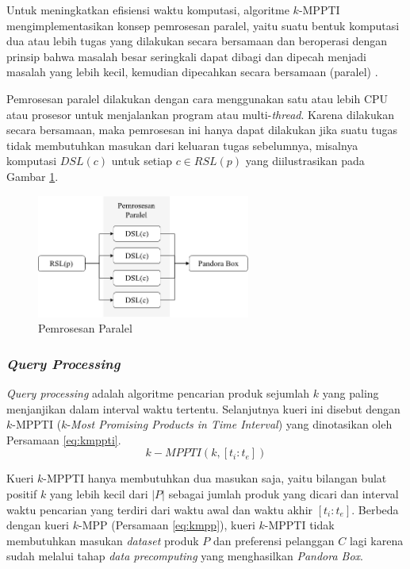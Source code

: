
Untuk meningkatkan efisiensi waktu komputasi, algoritme $k$-MPPTI mengimplementasikan konsep pemrosesan paralel, yaitu suatu bentuk komputasi dua atau lebih tugas yang dilakukan secara bersamaan dan beroperasi dengan prinsip bahwa masalah besar seringkali dapat dibagi dan dipecah menjadi masalah yang lebih kecil, kemudian dipecahkan secara bersamaan (paralel) \cite{paralel}. 

Pemrosesan paralel dilakukan dengan cara menggunakan satu atau lebih CPU atau prosesor untuk menjalankan program atau multi-\textit{thread}. Karena dilakukan secara bersamaan, maka pemrosesan ini hanya dapat dilakukan jika suatu tugas tidak membutuhkan masukan dari keluaran tugas sebelumnya, misalnya komputasi $DSL(c)$ untuk setiap $c \in RSL(p)$ yang diilustrasikan pada Gambar \ref{fig:paralel}.

\begin{figure}[h]
	\centering
	\includegraphics[width=7cm]{assets/img/bab3/paralel.png}
	\caption{Pemrosesan Paralel}
	\label{fig:paralel}
\end{figure}

\subsubsection{\textit{Query Processing}}
\tab \textit{Query processing} adalah algoritme pencarian produk sejumlah $k$ yang paling menjanjikan dalam interval waktu tertentu. Selanjutnya kueri ini disebut dengan $k$-MPPTI ($k$-\textit{Most Promising Products in Time Interval}) yang dinotasikan oleh Persamaan \ref{eq:kmppti}. 
\begin{equation}\label{eq:kmppti}
k-MPPTI(k, [t_i:t_e])
\end{equation} 

Kueri $k$-MPPTI hanya membutuhkan dua masukan saja, yaitu bilangan bulat positif $k$ yang lebih kecil dari $|P|$ sebagai jumlah produk yang dicari dan interval waktu pencarian yang terdiri dari waktu awal dan waktu akhir $[t_i:t_e]$. Berbeda dengan kueri $k$-MPP (Persamaan \ref{eq:kmpp}), kueri $k$-MPPTI tidak membutuhkan masukan \textit{dataset} produk $P$ dan preferensi pelanggan $C$ lagi karena sudah melalui tahap \textit{data precomputing} yang menghasilkan \textit{Pandora Box}.  

